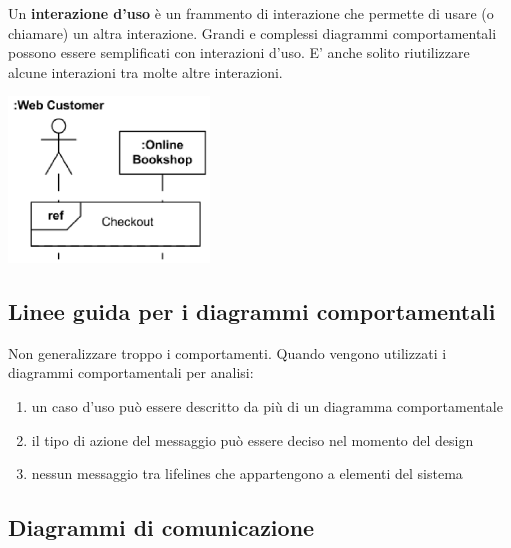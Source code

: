 \documentclass{article}
\begin{document}
Un \textbf{interazione d'uso} è un frammento di interazione che permette di usare (o chiamare) un altra interazione. Grandi e complessi diagrammi comportamentali possono essere semplificati con interazioni d'uso. E' anche solito riutilizzare alcune interazioni tra molte altre interazioni.
\begin{center}
    \includegraphics[width=0.4\textwidth]{foto 14.png}
\end{center}

\subsection*{Linee guida per i  diagrammi comportamentali}
\large

Non generalizzare troppo i comportamenti. Quando vengono utilizzati i diagrammi comportamentali per analisi:
\begin{enumerate}
    \renewcommand{\labelenumi}{-}
    \item un caso d'uso può essere descritto da più di un diagramma comportamentale
    \item il tipo di azione del messaggio può essere deciso nel momento del design
    \item nessun messaggio tra lifelines che appartengono a elementi del sistema
\end{enumerate}

\subsection*{Diagrammi di comunicazione}
\large
\end{document}
